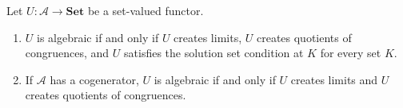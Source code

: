 Let $U: \mathcal{A} \longrightarrow \mathbf{Set}$ be a set-valued functor.
\begin{enumerate}
\item $U$ is algebraic if and only if $U$ creates limits, $U$ creates quotients of congruences, and $U$ satisfies the solution set condition at $K$ for every set $K$.
\item If $\mathcal{A}$ has a cogenerator, $U$ is algebraic if and only if $U$ creates limits and $U$ creates quotients of congruences.
\end{enumerate}
